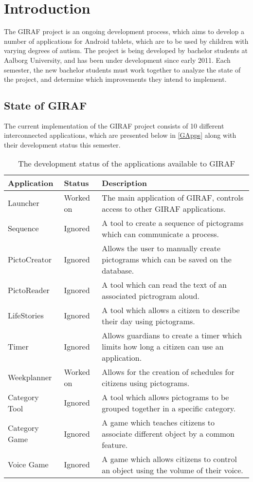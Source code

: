 \chapter{Introduction}
The GIRAF project is an ongoing development process, which aims to develop a
number of applications for Android tablets, which are to be used by children
with varying degrees of autism. The project is being developed by bachelor
students at Aalborg University, and has been under development since early 2011.
Each semester, the new bachelor students must work together to analyze the state
of the project, and determine which improvements they intend to implement.

\section{State of GIRAF}

The current implementation of the GIRAF project consists of 10 different
interconnected applications, which are presented below in \autoref{GApps} along
with their development status this semester.

\begin{table}[H]
\centering
\begin{tabular}{|p{2.8cm}|p{2.2cm}|p{7cm}|}
\hline
Application			& Status & Description \\\hline
Launcher  			& Worked on & The main application of GIRAF, controls access
to other GIRAF applications. \\\hline 
Sequence	       	& Ignored & A tool to create a sequence of pictograms which can
communicate a process.\\\hline 
PictoCreator  	   	& Ignored & Allows the user to manually create pictograms
which can be saved on the database.\\\hline
PictoReader	   		& Ignored & A tool which can read the text of an associated
pictrogram aloud.\\\hline
LifeStories	   		& Ignored & A tool which allows a citizen to describe their day
using pictograms.\\\hline 
Timer     	   		& Ignored & Allows guardians to create a timer which
limits how long a citizen can use an application.\\\hline 
Weekplanner 		& Worked on & Allows for the creation of schedules for citizens
using pictograms. \\\hline 
Category Tool		& Ignored & A tool which allows pictograms to be grouped together
in a specific category. \\\hline 
Category Game   	& Ignored & A game which teaches citizens to associate
different object by a common feature. \\\hline 
Voice Game  		& Ignored & A game which allows citizens to control an object
using the volume of their voice. \\\hline
\end{tabular} 
\caption{The development status of the applications available to GIRAF}
\label{GApps}
\end{table}

